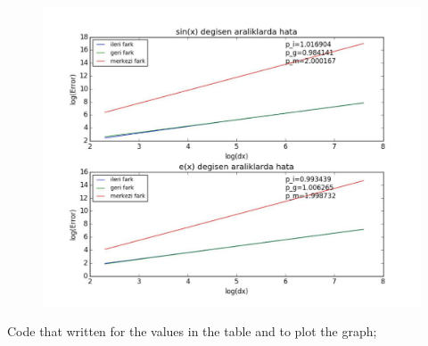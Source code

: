 \documentclass[paper=a4, fontsize=11pt]{scrartcl} %
\newif\ifcomment
\numberwithin{equation}{section} %
\numberwithin{figure}{section} %
\numberwithin{table}{section} %
\begin{document}
\begin{figure}[h]
\centering
\includegraphics[scale=0.7]{graph1}
\end{figure}

\ifcomment
Code that written for the values in the table and to plot the graph;
\end{document}
